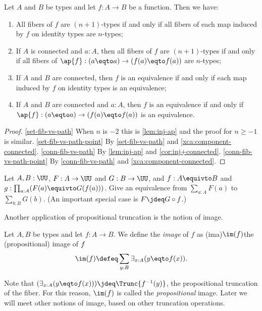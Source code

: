 \begin{corollary}\label{cor:fib-vs-path}
Let $A$ and $B$ be types and let $f:A\to B$ be a function. Then we have:
\begin{enumerate}
\item\label{set-fib-vs-path}
All fibers of $f$ are $(n{+}1)$-types if and only if all fibers of
each map induced by $f$ on identity types are $n$-types;
\item\label{set-fib-vs-path-point}
If $A$ is connected and $a:A$, then
all fibers of $f$ are $(n{+}1)$-types if and only if all fibers of
$\ap{f}: (a \eqto a) \to (f(a) \eqto f(a))$ are $n$-types;
\item\label{conn-fib-vs-path}
If $A$ and $B$ are connected, then $f$ is an equivalence
if and only if each map induced by $f$ on identity types is an equivalence;
\item\label{conn-fib-vs-path-point}
If $A$ and $B$ are connected and $a:A$, then $f$ is an equivalence
if and only if $\ap{f}: (a \eqto a) \to (f(a) \eqto f(a))$ is an equivalence.
\end{enumerate}
\end{corollary}
\begin{proof}
\ref{set-fib-vs-path} When $n$ is $-2$ this is \cref{lem:inj-ap}
and the proof for $n\geq -1$ is similar.
\ref{set-fib-vs-path-point} By \ref{set-fib-vs-path} and \cref{xca:component-connected}.
\ref{conn-fib-vs-path} By \cref{lem:inj-ap} and \cref{cor:inj+connected}.
\ref{conn-fib-vs-path-point} By \ref{conn-fib-vs-path} and \cref{xca:component-connected}.
\end{proof}

\begin{xca}\label{xca:sum-equivalences}
Let $A,B:\UU$, $F:A\to\UU$ and $G:B\to\UU$,
and $f: A\equivto B$ and $g:\prod_{a:A}(F(a) \equivto G(f(a)))$.
Give an equivalence from $\sum_{a:A} F(a)$ to $\sum_{b:B} G(b)$.
(An important special case is $F\jdeq G\circ f$.)
\end{xca}

Another application of propositional truncation
is the notion of image.
\begin{definition}\label{def:prop-image}
  Let $A,B$ be types and let $f : A \to B$. We define the \emph{image} of $f$ as
  \glossary(ima){$\protect\im(f)$}{the (propositional) image of $\protect f$}
  \[
    \im(f) \defeq \sum_{y:B}\exists_{x:A}(y \eqto f(x)).\qedhere
  \]
\end{definition}

Note that $(\exists_{x:A}(y \eqto f(x))) \jdeq \Trunc{f^{-1}(y)}$,
the propositional truncation of the fiber.
For this reason, $\im(f)$ is called the \emph{propositional} image.
Later we will meet other notions of image, based on other truncation operations.

